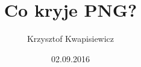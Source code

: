\documentclass[]{beamer}
\title[Co kryje PNG?]{Co kryje PNG?}
\author[Krzysztof Kwapisiewicz]{Krzysztof Kwapisiewicz}
\institute{Software Engineer @ Codilime}
\date{02.09.2016}
\begin{document}
\begin{frame}
  \begin{titlepage}
  \end{titlepage}
\end{frame}
\end{document}
